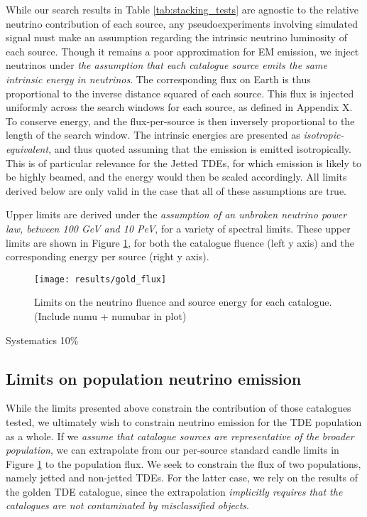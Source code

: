 While our search results in Table \ref{tab:stacking_tests} are agnostic to the relative neutrino contribution of each source, any pseudoexperiments involving simulated signal must make an assumption regarding the intrinsic neutrino luminosity of each source. Though it remains a poor approximation for EM emission, we inject neutrinos under \emph{the assumption that each catalogue source emits the same intrinsic energy in neutrinos}. The corresponding flux on Earth is thus proportional to the inverse distance squared of each source. This flux is injected uniformly across the search windows for each source, as defined in Appendix X. To conserve energy, and the flux-per-source is then inversely proportional to the length of the search window. The intrinsic energies are presented as \emph{isotropic-equivalent}, and thus quoted assuming that the emission is emitted isotropically. This is of particular relevance for the Jetted TDEs, for which emission is likely to be highly beamed, and the energy would then be scaled accordingly. All limits derived below are only valid in the case that all of these assumptions are true.

Upper limits are derived under the \emph{assumption of an unbroken neutrino power law, between 100 GeV and 10 PeV}, for a variety of spectral limits. These upper limits are shown in Figure \ref{fig:cat_upper_limit}, for both the catalogue fluence (left y axis) and the corresponding energy per source (right y axis). 

\begin{figure}[!ht]
	\centering \texttt{[image: results/gold\_flux]}
	\caption{Limits on the neutrino fluence and source energy for each catalogue. (Include numu + numubar in plot)}
	\label{fig:cat_upper_limit}
\end{figure}

Systematics 10\%

\subsection{Limits on population neutrino emission}

While the limits presented above constrain the contribution of those catalogues tested, we ultimately wish to constrain neutrino emission for the TDE population as a whole. If we \emph{assume that catalogue sources are representative of the broader population}, we can extrapolate from our per-source standard candle limits in Figure \ref{fig:cat_upper_limit} to the population flux. We seek to constrain the flux of two populations, namely jetted and non-jetted TDEs. For the latter case, we rely on the results of the golden TDE catalogue, since the extrapolation \emph{implicitly requires that the catalogues are not contaminated by misclassified objects}.

